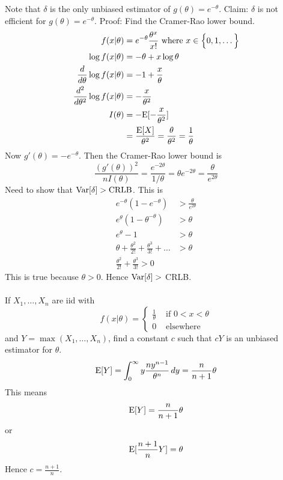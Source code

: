 \documentclass[12pt]{article}
\begin{document}
Note that $\delta$ is the only unbiased estimator of $g(\theta) = e^{-\theta}$. Claim: $\delta$ is not efficient for $g(\theta) = e^{-\theta} $. Proof: Find the Cramer-Rao lower bound. $$ \begin{aligned} f(x|\theta) &= e^{-\theta} \frac{\theta^x}{x!} \text{ where } x \in \Big\{ 0,1,\dots \Big\} \\ \log f(x|\theta) &= -\theta + x\log \theta \\ \frac{d}{d\theta} \log f(x|\theta) &= -1 + \frac{x}{\theta} \\ \frac{d^2}{d\theta^2} \log f(x|\theta) &= -\frac{x}{\theta^2} \\ I(\theta) &= -\mathrm{E}[ -\frac{x}{\theta^2} ] \\ &= \frac{\mathrm{E}[ X ]}{\theta^2} = \frac{\theta}{\theta^2} = \frac{1}{\theta} \end{aligned} $$ Now $g'(\theta) = -e^{-\theta}$. Then the Cramer-Rao lower bound is $$ \frac{(g'(\theta))^2}{nI(\theta)} = \frac{e^{-2\theta}}{1/\theta} = \theta e^{-2\theta} = \frac{\theta}{e^{2\theta}} $$ Need to show that $\mathrm{Var}[ \delta ] > \text{CRLB}$. This is $$ \begin{aligned} e^{-\theta}(1-e^{-\theta}) &> \frac{\theta}{e^{2\theta}} \\ e^\theta(1-\theta^{-\theta}) &> \theta \\ e^\theta - 1 &> \theta \\ \theta + \frac{\theta^2}{2!} + \frac{\theta^3}{3!}+ \dots &> \theta \\ \frac{\theta^2}{2!} + \frac{\theta^3}{3!} > 0 \end{aligned} $$ This is true because $\theta >0$. Hence $\mathrm{Var}[ \delta ] > $ CRLB. \\~\\
If $X_1,\dots,X_n$ are iid with $$f(x|\theta) = \begin{cases} \frac{1}{\theta} &\text{ if } 0 < x < \theta \\ 0 &\text{ elsewhere} \end{cases} $$ and $Y = \max(X_1,\dots,X_n)$, find a constant $c$ such that $cY$ is an unbiased estimator for $\theta$. 
$$ \mathrm{E}[ Y ] = \int_0^\infty y \frac{ny^{n-1}}{\theta^n} \, dy = \frac{n}{n+1}\theta $$ 
This means $$ \mathrm{E}[ Y ] = \frac{n}{n+1}\theta $$ or $$ \mathrm{E}[ \frac{n+1}{n} Y ] = \theta$$ Hence $c = \frac{n+1}{n}$. \\~\\
\end{document}
